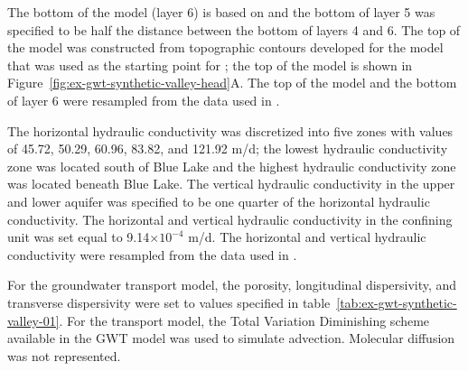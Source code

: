 The bottom of the model (layer 6) is based on \cite{hill1998controlled} and the bottom of layer 5 was specified to be half the distance between the bottom of layers 4 and 6. The top of the model was constructed from topographic contours developed for the model that was used as the starting point for \cite{hill1998controlled}; the top of the model is shown in Figure~\ref{fig:ex-gwt-synthetic-valley-head}A. The top of the model and the bottom of layer 6 were resampled from the data used in \cite{hill1998controlled}.

The horizontal hydraulic conductivity was discretized into five zones with values of 45.72, 50.29, 60.96, 83.82, and 121.92 m/d; the lowest hydraulic conductivity zone was located south of Blue Lake and the highest hydraulic conductivity zone was located beneath Blue Lake. The vertical hydraulic conductivity in the upper and lower aquifer was specified to be one quarter of the horizontal hydraulic conductivity. The horizontal and vertical hydraulic conductivity in the confining unit was set equal to 9.14$\times10^{-4}$ m/d. The horizontal and vertical hydraulic conductivity were resampled from the data used in \cite{hill1998controlled}.

For the groundwater transport model, the porosity, longitudinal dispersivity, and transverse dispersivity were set to values specified in table~\ref{tab:ex-gwt-synthetic-valley-01}. For the transport model, the Total Variation Diminishing scheme available in the GWT model \citep{modflow6gwt} was used to simulate advection. Molecular diffusion was not represented.



